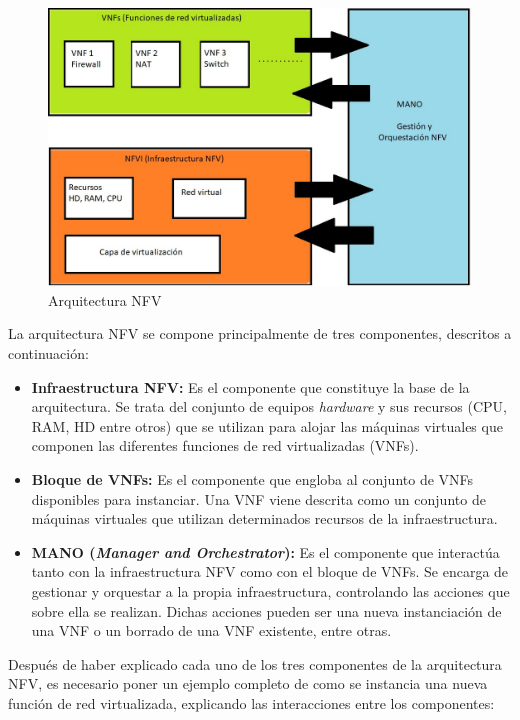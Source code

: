 \begin{figure}[!ht]
	\centering
	\includegraphics[width=0.75\linewidth]{imagenes/arquitectura_nfv}
	\caption{Arquitectura NFV}
	\label{fig:arquitecturanfv}
\end{figure}

La arquitectura NFV se compone principalmente de tres componentes, descritos a continuación:

\begin{itemize}
	\item \textbf{Infraestructura NFV:} Es el componente que constituye la base de la arquitectura. Se trata del conjunto de equipos \textit{hardware} y sus recursos (CPU, RAM, HD entre otros) que se utilizan para alojar las máquinas virtuales que componen las diferentes funciones de red virtualizadas (VNFs).
	
	\item \textbf{Bloque de VNFs:} Es el componente que engloba al conjunto de VNFs disponibles para instanciar. Una VNF viene descrita como un conjunto de máquinas virtuales que utilizan determinados recursos de la infraestructura.
	
	\item \textbf{MANO (\textit{Manager and Orchestrator}):} Es el componente que interactúa tanto con la infraestructura NFV como con el bloque de VNFs. Se encarga de gestionar y orquestar a la propia infraestructura, controlando las acciones que sobre ella se realizan. Dichas acciones pueden ser una nueva instanciación de una VNF o un borrado de una VNF existente, entre otras.
	
\end{itemize}

Después de haber explicado cada uno de los tres componentes de la arquitectura NFV, es necesario poner un ejemplo completo de como se instancia una nueva función de red virtualizada, explicando las interacciones entre los componentes:

